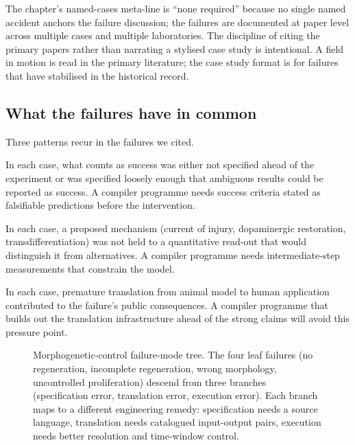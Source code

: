 The chapter's named-cases meta-line is ``none required'' because no
single named accident anchors the failure discussion; the failures are
documented at paper level across multiple cases and multiple
laboratories. The discipline of citing the primary papers rather than
narrating a stylised case study is intentional. A field in motion is
read in the primary literature; the case study format is for failures
that have stabilised in the historical record.

\subsection{What the failures have in common}

Three patterns recur in the failures we cited.

 In each case, what counts as
success was either not specified ahead of the experiment or was
specified loosely enough that ambiguous results could be reported as
success. A compiler programme needs success criteria stated as
falsifiable predictions before the intervention.

 In each case, a proposed mechanism
(current of injury, dopaminergic restoration, transdifferentiation)
was not held to a quantitative read-out that would distinguish it
from alternatives. A compiler programme needs intermediate-step
measurements that constrain the model.

 In each case, premature translation
from animal model to human application contributed to the failure's
public consequences. A compiler programme that builds out the
translation infrastructure ahead of the strong claims will avoid this
pressure point.

\begin{figure}[ht]
  \centering
  
  \caption{Morphogenetic-control failure-mode tree. The four leaf
  failures (no regeneration, incomplete regeneration, wrong
  morphology, uncontrolled proliferation) descend from three branches
  (specification error, translation error, execution error). Each
  branch maps to a different engineering remedy: specification needs a
  source language, translation needs catalogued input-output pairs,
  execution needs better resolution and time-window control.}
  \label{fig:vol06ch13-failure-tree}
\end{figure}

